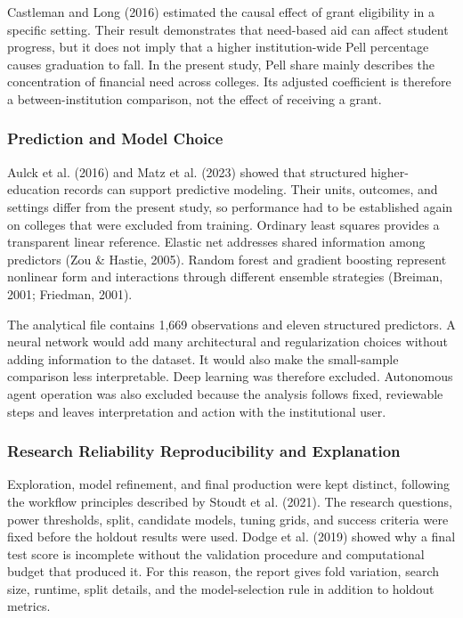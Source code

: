 \documentclass[12pt,a4paper]{article}
\begin{document}
Castleman and Long (2016) estimated the causal effect of grant eligibility in a specific setting. Their result demonstrates that need-based aid can affect student progress, but it does not imply that a higher institution-wide Pell percentage causes graduation to fall. In the present study, Pell share mainly describes the concentration of financial need across colleges. Its adjusted coefficient is therefore a between-institution comparison, not the effect of receiving a grant.

\subsubsection{Prediction and Model Choice}

Aulck et al. (2016) and Matz et al. (2023) showed that structured higher-education records can support predictive modeling. Their units, outcomes, and settings differ from the present study, so performance had to be established again on colleges that were excluded from training. Ordinary least squares provides a transparent linear reference. Elastic net addresses shared information among predictors (Zou \& Hastie, 2005). Random forest and gradient boosting represent nonlinear form and interactions through different ensemble strategies (Breiman, 2001; Friedman, 2001).

The analytical file contains 1,669 observations and eleven structured predictors. A neural network would add many architectural and regularization choices without adding information to the dataset. It would also make the small-sample comparison less interpretable. Deep learning was therefore excluded. Autonomous agent operation was also excluded because the analysis follows fixed, reviewable steps and leaves interpretation and action with the institutional user.

\subsubsection{Research Reliability Reproducibility and Explanation}

Exploration, model refinement, and final production were kept distinct, following the workflow principles described by Stoudt et al. (2021). The research questions, power thresholds, split, candidate models, tuning grids, and success criteria were fixed before the holdout results were used. Dodge et al. (2019) showed why a final test score is incomplete without the validation procedure and computational budget that produced it. For this reason, the report gives fold variation, search size, runtime, split details, and the model-selection rule in addition to holdout metrics.
\end{document}
